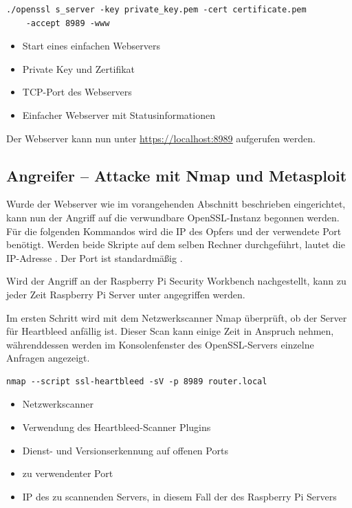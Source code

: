 \begin{lstlisting}
./openssl s_server -key private_key.pem -cert certificate.pem
	-accept 8989 -www
\end{lstlisting}

\begin{itemize}
	\item {} Start eines einfachen Webservers
	\item {} Private Key und Zertifikat
	\item {} TCP-Port des Webservers
	\item {} Einfacher Webserver mit Statusinformationen
\end{itemize}

Der Webserver kann nun unter \url{https://localhost:8989} aufgerufen werden.

\subsection{Angreifer -- Attacke mit Nmap und Metasploit}

Wurde der Webserver wie im vorangehenden Abschnitt beschrieben eingerichtet, kann nun der Angriff auf die verwundbare OpenSSL-Instanz begonnen werden. Für die folgenden Kommandos wird die IP des Opfers und der verwendete Port benötigt. Werden beide Skripte auf dem selben Rechner durchgeführt, lautet die IP-Adresse . Der Port ist standardmäßig .

Wird der Angriff an der Raspberry Pi Security Workbench nachgestellt, kann zu jeder Zeit Raspberry Pi Server unter  angegriffen werden.

Im ersten Schritt wird mit dem Netzwerkscanner Nmap überprüft, ob der Server für Heartbleed anfällig ist. Dieser Scan kann einige Zeit in Anspruch nehmen, währenddessen werden im Konsolenfenster des OpenSSL-Servers einzelne Anfragen angezeigt.

\begin{lstlisting}
nmap --script ssl-heartbleed -sV -p 8989 router.local
\end{lstlisting}

\begin{itemize}
	\item {} Netzwerkscanner
	\item {} Verwendung des Heartbleed-Scanner Plugins
	\item {} Dienst- und Versionserkennung auf offenen Ports
	\item {} zu verwendenter Port
	\item {} IP des zu scannenden Servers, in diesem Fall der des Raspberry Pi Servers
\end{itemize}

